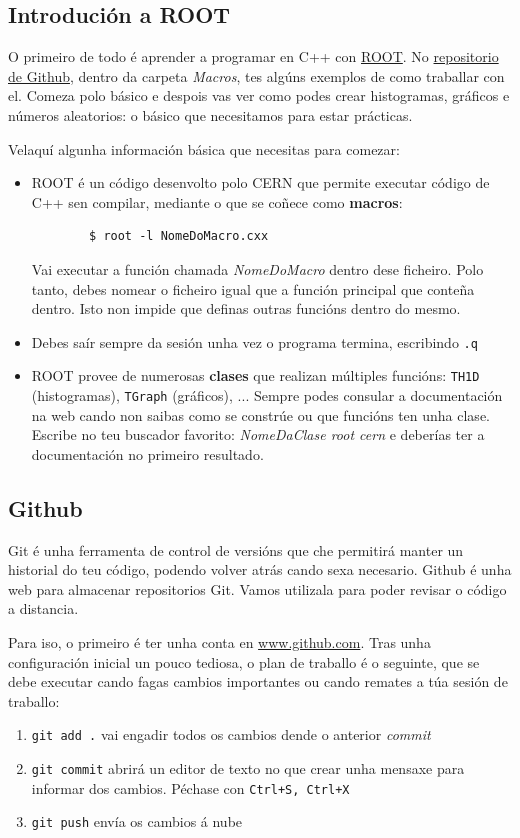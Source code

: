 \documentclass[11pt, a4paper]{article}
\begin{document}
\subsection{Introdución a ROOT}
O primeiro de todo é aprender a programar en C++ con \href{https://root.cern.ch/}{ROOT}. No \href{https://github.com/Practicas24/Practicas_24}{repositorio de Github}, dentro da carpeta \textit{Macros}, tes algúns exemplos de como traballar con el. Comeza polo básico e despois vas ver como podes crear histogramas, gráficos e números aleatorios: o básico que necesitamos para estar prácticas.

Velaquí algunha información básica que necesitas para comezar:
\begin{itemize}
    \item ROOT é un código desenvolto polo CERN que permite executar código de C++ sen compilar, mediante o que se coñece como \textbf{macros}:
          \begin{lstlisting}
        $ root -l NomeDoMacro.cxx
    \end{lstlisting}

          Vai executar a función chamada \textit{NomeDoMacro} dentro dese ficheiro. Polo tanto, debes nomear o ficheiro igual que a función principal que conteña dentro. Isto non impide que definas outras funcións dentro do mesmo.
    \item Debes saír sempre da sesión unha vez o programa termina, escribindo
          \lstinline|.q|
    \item ROOT provee de numerosas \textbf{clases} que realizan múltiples funcións: \lstinline|TH1D| (histogramas), \lstinline|TGraph| (gráficos), ... Sempre podes consular a documentación na web cando non saibas como se constrúe ou que funcións ten unha clase. Escribe no teu buscador favorito: \textit{NomeDaClase root cern} e deberías ter a documentación no primeiro resultado.
\end{itemize}

\subsection{Github}
Git é unha ferramenta de control de versións que che permitirá manter un historial do teu código, podendo volver atrás cando sexa necesario. Github é unha web para almacenar repositorios Git. Vamos utilizala para poder revisar o código a distancia.

Para iso, o primeiro é ter unha conta en \url{www.github.com}. Tras unha configuración inicial un pouco tediosa, o plan de traballo é o seguinte, que se debe executar cando fagas cambios importantes ou cando remates a túa sesión de traballo:
\begin{enumerate}
    \item \lstinline|git add .| vai engadir todos os cambios dende o anterior \textit{commit}
    \item \lstinline|git commit| abrirá un editor de texto no que crear unha mensaxe para informar dos cambios. Péchase con \lstinline|Ctrl+S, Ctrl+X|
    \item \lstinline|git push| envía os cambios á nube
\end{enumerate}
\end{document}

